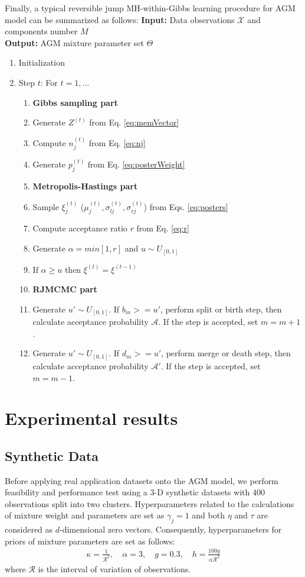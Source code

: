 \documentclass[conference]{IEEEtran}
\begin{document}
Finally, a typical reversible jump MH-within-Gibbs learning procedure for AGM model can be summarized as follows:
\noindent\textbf{Input:} Data observations $\mathcal{X}$ and components number $M$ \\
\textbf{Output:} AGM mixture parameter set $\Theta$
\begin{enumerate}
\item Initialization
\item Step $t$: For $t = 1,\ldots$
\begin{enumerate}
\item[]\textbf{Gibbs sampling part}
\item Generate $Z^{(t)}$ from Eq. \eqref{eq:memVector}
\item Compute $n_j^{(t)}$ from Eq. \eqref{eq:nj}
\item Generate $p_j^{(t)}$ from Eq. \eqref{eq:posterWeight}
\item[] \textbf{Metropolis-Hastings part}
\item Sample $\xi_j^{(t)}$ ($\mu_j^{(t)}, \sigma_{lj}^{(t)}, \sigma_{rj}^{(t)}$) from Eqs. \eqref{eq:posters}
\item Compute acceptance ratio $r$ from Eq. \eqref{eq:r}
\item Generate $\alpha = min[1,r]$ and $u \sim U_{[0,1]}$
\item If $\alpha \geq u$ then $\xi^{(t)} = \xi^{(t-1)}$
\item[] \textbf{RJMCMC part}
\item Generate $u' \sim U_{[0,1]}$. If $b_m>=u'$, perform split or birth step, then calculate acceptance probability $\mathcal{A}$. If the step is accepted, set $m=m+1$.
\item Generate $u' \sim U_{[0,1]}$. If $d_m>=u'$, perform merge or death step, then calculate acceptance probability $\mathcal{A}'$. If the step is accepted, set $m=m-1$.
\end{enumerate}
\end{enumerate}

\section{Experimental results}



\subsection{Synthetic Data}

Before applying real application datasets onto the AGM model, we perform feasibility and performance test using a 3-D synthetic datasets with 400 observations split into two clusters. Hyperparameters related to the calculations of mixture weight and parameters are set as $\gamma_j = 1$ and both $\eta$ and $\tau$ are considered as $d$-dimensional zero vectors. Consequently, hyperparameters for priors of mixture parameters are set as follows\cite{b13}:
\begin{align}
\kappa = \frac{1}{\mathcal{R}^2}, \quad \alpha = 3, \quad g=0.3, \quad h=\frac{100g}{\alpha\mathcal{R}^2}
\label{eq:hypers}
\end{align}
where $\mathcal{R}$ is the interval of variation of observations.
\end{document}

